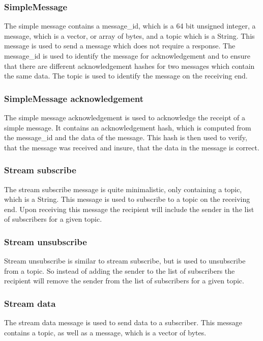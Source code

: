 \subsubsection{SimpleMessage}
The simple message contains a message\_id, which is a 64 bit unsigned integer, a message, which is a vector, or array of bytes,
and a topic which is a String. This message is used to send a message which does not require a response. 
The message\_id is used to identify the message for acknowledgement and to ensure that there are different acknowledgement hashes
for two messages which contain the same data. The topic is used to identify the message on the receiving end.

\subsubsection{SimpleMessage acknowledgement}
The simple message acknowledgement is used to acknowledge the receipt of a simple message. It contains an acknowledgement hash, which is computed
from the message\_id and the data of the message. This hash is then used to verify, that the message was received and insure, that the data in the
message is correct.

\subsubsection{Stream subscribe}
The stream subscribe message is quite minimalistic, only containing a topic, which is a String. This message is used to subscribe to a topic
on the receiving end. Upon receiving this message the recipient will include the sender in the list of subscribers for a given topic. 

\subsubsection{Stream unsubscribe}
Stream unsubscribe is similar to stream subscribe, but is used to unsubscribe from a topic. So instead of adding the sender to the list of subscribers
the recipient will remove the sender from the list of subscribers for a given topic.

\subsubsection{Stream data}
The stream data message is used to send data to a subscriber. This message contains a topic, as well as a message, which is a vector of bytes.

